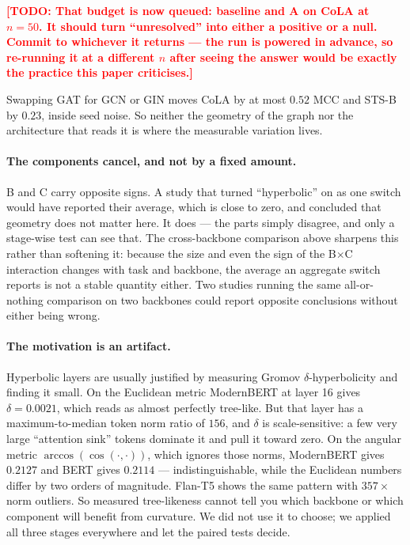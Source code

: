 \documentclass{article}
\newcommand{\TODO}[1]{\textcolor{red}{\textbf{[TODO: #1]}}}
\begin{document}
\TODO{That budget is now queued: baseline and A on CoLA at $n=50$. It should
turn ``unresolved'' into either a positive or a null. Commit to whichever it
returns --- the run is powered in advance, so re-running it at a different $n$
after seeing the answer would be exactly the practice this paper criticises.}

Swapping GAT for GCN or GIN moves CoLA by at most $0.52$ MCC and STS-B by
$0.23$, inside seed noise. So neither the geometry of the graph nor the
architecture that reads it is where the measurable variation lives.

\paragraph{The components cancel, and not by a fixed amount.} B and C carry
opposite signs. A study that turned ``hyperbolic'' on as one switch would have
reported their average, which is close to zero, and concluded that geometry
does not matter here. It does --- the parts simply disagree, and only a
stage-wise test can see that. The cross-backbone comparison above sharpens this
rather than softening it: because the size and even the sign of the
B$\times$C interaction changes with task and backbone, the average an aggregate
switch reports is not a stable quantity either. Two studies running the same
all-or-nothing comparison on two backbones could report opposite conclusions
without either being wrong.

\paragraph{The motivation is an artifact.} Hyperbolic layers are usually
justified by measuring Gromov $\delta$-hyperbolicity and finding it small. On
the Euclidean metric ModernBERT at layer 16 gives $\delta = 0.0021$, which reads
as almost perfectly tree-like. But that layer has a maximum-to-median token norm
ratio of $156$, and $\delta$ is scale-sensitive: a few very large ``attention
sink'' tokens dominate it and pull it toward zero. On the angular metric
$\arccos(\cos(\cdot,\cdot))$, which ignores those norms, ModernBERT gives
$0.2127$ and BERT gives $0.2114$ --- indistinguishable, while the Euclidean
numbers differ by two orders of magnitude. Flan-T5 shows the same pattern with
$357\times$ norm outliers. So measured tree-likeness cannot tell you which
backbone or which component will benefit from curvature. We did not use it to
choose; we applied all three stages everywhere and let the paired tests decide.
\end{document}
